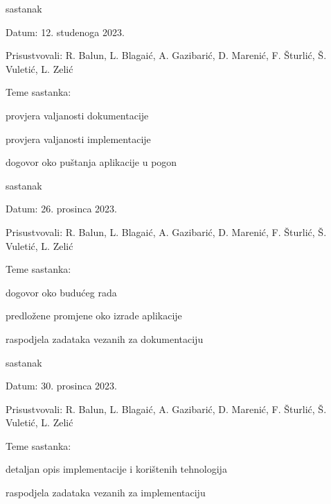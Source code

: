 \begin{packed_enum}
			\item  sastanak
			\item[] \begin{packed_item}
				\item Datum: 12. studenoga 2023.
				\item Prisustvovali: R. Balun, L. Blagaić, A. Gazibarić, D. Marenić, F. Šturlić, Š. Vuletić, L. Zelić
				\item Teme sastanka:
				\begin{packed_item}
					\item  provjera valjanosti dokumentacije
					\item  provjera valjanosti implementacije
					\item  dogovor oko puštanja aplikacije u pogon
				\end{packed_item}
			\end{packed_item}
			
			\item  sastanak
			\item[] \begin{packed_item}
				\item Datum: 26. prosinca 2023.
				\item Prisustvovali: R. Balun, L. Blagaić, A. Gazibarić, D. Marenić, F. Šturlić, Š. Vuletić, L. Zelić
				\item Teme sastanka:
				\begin{packed_item}
					\item  dogovor oko budućeg rada
					\item  predložene promjene oko izrade aplikacije
					\item  raspodjela zadataka vezanih za dokumentaciju
				\end{packed_item}
			\end{packed_item}
			
			\item  sastanak
			\item[] \begin{packed_item}
				\item Datum: 30. prosinca 2023.
				\item Prisustvovali: R. Balun, L. Blagaić, A. Gazibarić, D. Marenić, F. Šturlić, Š. Vuletić, L. Zelić
				\item Teme sastanka:
				\begin{packed_item}
					\item  detaljan opis implementacije i korištenih tehnologija
					\item  raspodjela zadataka vezanih za implementaciju
				\end{packed_item}
			\end{packed_item}
			

\end{packed_enum}
